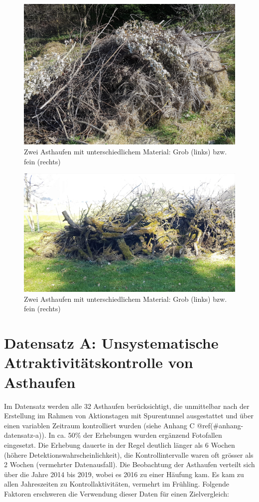 \documentclass[
  oneside]{scrbook}
\begin{document}
\begin{figure}
\includegraphics[width=0.49\linewidth]{images/feines_astmaterial} \caption{Zwei Asthaufen mit unterschiedlichem Material: Grob (links) bzw. fein (rechts)}\label{fig:astmaterial-1}
\end{figure}
\begin{figure}
\includegraphics[width=0.49\linewidth]{images/grobes_astmaterial} \caption{Zwei Asthaufen mit unterschiedlichem Material: Grob (links) bzw. fein (rechts)}\label{fig:astmaterial-2}
\end{figure}

\hypertarget{datensatz-a-unsystematische-attraktivituxe4tskontrolle-von-asthaufen}{%
\section{Datensatz A: Unsystematische Attraktivitätskontrolle von Asthaufen}\label{datensatz-a-unsystematische-attraktivituxe4tskontrolle-von-asthaufen}}

Im Datensatz werden alle 32 Asthaufen berücksichtigt, die unmittelbar nach der Erstellung im Rahmen von Aktionstagen mit Spurentunnel ausgestattet und über einen variablen Zeitraum kontrolliert wurden (siehe Anhang C @ref(\#anhang-datensatz-a)). In ca. 50\% der Erhebungen wurden ergänzend Fotofallen eingesetzt. Die Erhebung dauerte in der Regel deutlich länger als 6 Wochen (höhere Detektionswahrscheinlichkeit), die Kontrollintervalle waren oft grösser als 2 Wochen (vermehrter Datenausfall). Die Beobachtung der Asthaufen verteilt sich über die Jahre 2014 bis 2019, wobei es 2016 zu einer Häufung kam. Es kam zu allen Jahreszeiten zu Kontrollaktivitäten, vermehrt im Frühling. Folgende Faktoren erschweren die Verwendung dieser Daten für einen Zielvergleich:
\end{document}
